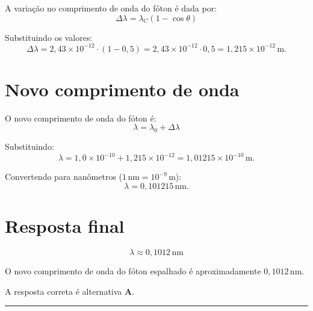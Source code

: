 \begin{flushleft}
A variação no comprimento de onda do fóton é dada por:
\[
\Delta \lambda = \lambda_C (1 - \cos\theta)
\]

Substituindo os valores:
\[
\Delta \lambda =
2{,}43 \times 10^{-12} \cdot (1 - 0{,}5) =
2{,}43 \times 10^{-12} \cdot 0{,}5 =
1{,}215 \times 10^{-12}\,\mathrm{m}.
\]

\section*{Novo comprimento de onda}

O novo comprimento de onda do fóton é:
\[
\lambda = \lambda_0 + \Delta\lambda
\]

Substituindo:
\[
\lambda =
1{,}0 \times 10^{-10} + 1{,}215 \times 10^{-12} =
1{,}01215 \times 10^{-10}\,\mathrm{m}.
\]

Convertendo para nanômetros (\(1\,\mathrm{nm} = 10^{-9}\,\mathrm{m}\)):
\[
\lambda =
0{,}101215\,\mathrm{nm}.
\]

\section*{Resposta final}

\[
\boxed{
\lambda \approx 0{,}1012\,\mathrm{nm}
}
\]

O novo comprimento de onda do fóton espalhado é aproximadamente \(0{,}1012\,\mathrm{nm}\).

A resposta correta é alternativa \colorbox{green!50}{\textbf{A}}.
\end{flushleft}

\noindent\rule{\linewidth}{0.6pt}\\

